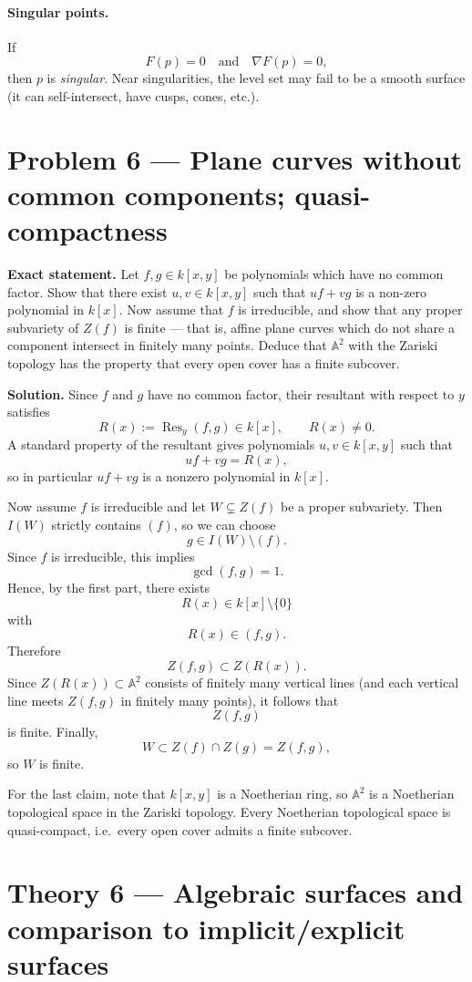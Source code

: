 \documentclass[12pt,a4paper]{article}
\theoremstyle{plain}
\theoremstyle{definition}      %
\begin{document}
\paragraph{Singular points.}
If
\[
F(p)=0
\quad\text{and}\quad
\nabla F(p)=0,
\]
then $p$ is \emph{singular}. Near singularities, the level set may fail to be a smooth surface (it can self-intersect, have cusps, cones, etc.).

\section*{Problem 6 — Plane curves without common components; quasi-compactness}

\textbf{Exact statement.}
Let $f,g\in k[x,y]$ be polynomials which have no common factor.
Show that there exist $u,v\in k[x,y]$ such that $uf+vg$ is a non-zero polynomial in $k[x]$.
Now assume that $f$ is irreducible, and show that any proper subvariety of $Z(f)$ is finite
--- that is, affine plane curves which do not share a component intersect in finitely many points.
Deduce that $\mathbb A^2$ with the Zariski topology has the property that every open cover has a finite subcover.

\textbf{Solution.}
Since $f$ and $g$ have no common factor, their resultant with respect to $y$ satisfies
\[
R(x)
:=
\operatorname{Res}_y(f,g)
\in
k[x],
\qquad
R(x)\neq 0.
\]
A standard property of the resultant gives polynomials $u,v\in k[x,y]$ such that
\[
u f + v g
=
R(x),
\]
so in particular $u f + v g$ is a nonzero polynomial in $k[x]$.

Now assume $f$ is irreducible and let $W\subsetneq Z(f)$ be a proper subvariety.
Then $I(W)$ strictly contains $(f)$, so we can choose
\[
g\in I(W)\setminus (f).
\]
Since $f$ is irreducible, this implies
\[
\gcd(f,g)=1.
\]
Hence, by the first part, there exists
\[
R(x)\in k[x]\setminus\{0\}
\]
with
\[
R(x)\in (f,g).
\]
Therefore
\[
Z(f,g)
\subset
Z(R(x)).
\]
Since $Z(R(x))\subset \mathbb A^2$ consists of finitely many vertical lines
(and each vertical line meets $Z(f,g)$ in finitely many points),
it follows that
\[
Z(f,g)
\]
is finite.
Finally,
\[
W
\subset
Z(f)\cap Z(g)
=
Z(f,g),
\]
so $W$ is finite.

For the last claim, note that $k[x,y]$ is a Noetherian ring, so $\mathbb A^2$ is a Noetherian topological space
in the Zariski topology.
Every Noetherian topological space is quasi-compact, i.e.\ every open cover admits a finite subcover.

\section*{Theory 6 — Algebraic surfaces and comparison to implicit/explicit surfaces}
\end{document}

